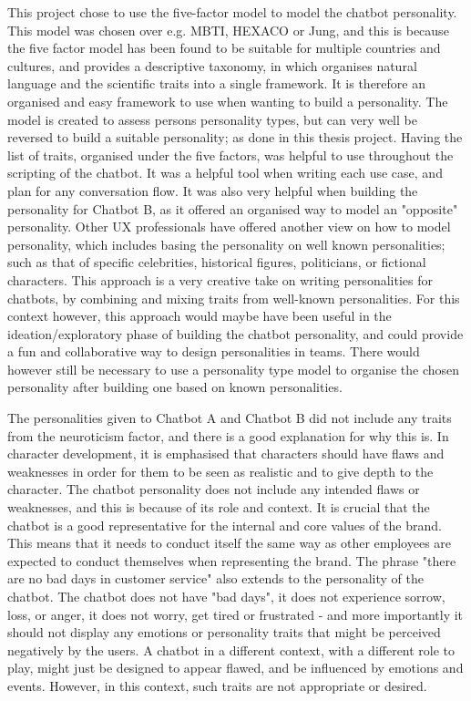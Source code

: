 This project chose to use the five-factor model to model the chatbot personality. This model was chosen over e.g. MBTI, HEXACO or Jung, and this is because the five factor model has been found to be suitable for multiple countries and cultures, and provides a descriptive taxonomy, in which organises natural language and the scientific traits into a single framework. It is therefore an organised and easy framework to use when wanting to build a personality. The model is created to assess persons personality types, but can very well be reversed to build a suitable personality; as done in this thesis project. Having the list of traits, organised under the five factors, was helpful to use throughout the scripting of the chatbot. It was a helpful tool when writing each use case, and plan for any conversation flow. It was also very helpful when building the personality for Chatbot B, as it offered an organised way to model an "opposite" personality. Other UX professionals have offered another view on how to model personality, which includes basing the personality on well known personalities; such as that of specific celebrities, historical figures, politicians, or fictional characters. This approach is a very creative take on writing personalities for chatbots, by combining and mixing traits from well-known personalities. For this context however, this approach would maybe have been useful in the ideation/exploratory phase of building the chatbot personality, and could provide a fun and collaborative way to design personalities in teams. There would however still be necessary to use a personality type model to organise the chosen personality after building one based on known personalities. 

The personalities given to Chatbot A and Chatbot B did not include any traits from the neuroticism factor, and there is a good explanation for why this is. In character development, it is emphasised that characters should have flaws and weaknesses in order for them to be seen as realistic and to give depth to the character. The chatbot personality does not include any intended flaws or weaknesses, and this is because of its role and context. It is crucial that the chatbot is a good representative for the internal and core values of the brand. This means that it needs to conduct itself the same way as other employees are expected to conduct themselves when representing the brand. The phrase "there are no bad days in customer service" also extends to the personality of the chatbot. The chatbot does not have "bad days", it does not experience sorrow, loss, or anger, it does not worry, get tired or frustrated - and more importantly it should not display any emotions or personality traits that might be perceived negatively by the users. A chatbot in a different context, with a different role to play, might just be designed to appear flawed, and be influenced by emotions and events. However, in this context, such traits are not appropriate or desired.


